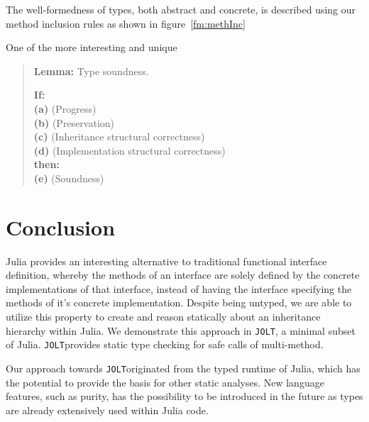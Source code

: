 \documentclass[preprint]{sigplanconf}
\newcommand{\xt}[1]{\texttt{#1}}
\newcommand{\jolt}{\xt{JOLT}}
\begin{document}
The well-formedness of types, both abstract and concrete, is described using our method inclusion rules as shown in 
figure~\ref{fm:methInc}

One of the more interesting and unique 

\begin{quote}{\bf Lemma: } Type soundness.

 {\bf If:} \\
   {\bf (a)} (Progress) \\
   {\bf (b)} (Preservation) \\  
   {\bf (c)} (Inheritance structural correctness) \\
   {\bf (d)} (Implementation structural correctness) \\
 
 {\bf then:}\\
   {\bf (e)} (Soundness)
\end{quote}

\section{Conclusion}

Julia provides an interesting alternative to traditional functional interface 
definition, whereby the methods of an interface are solely defined by 
the concrete implementations of that interface, instead of having the interface specifying
the methods of it's concrete implementation. Despite being
untyped, we are able to utilize this property to create and reason statically about an inheritance
hierarchy within Julia. We demonstrate this approach in \jolt, a minimal subset
of Julia. \jolt provides static type checking for safe calls of multi-method.

Our approach towards \jolt originated from the typed runtime of Julia, which has the potential to
provide the basis for other static analyses. New language features, such as purity, has the possibility
to be introduced in the future as types are already extensively used within Julia code.



\end{document}
